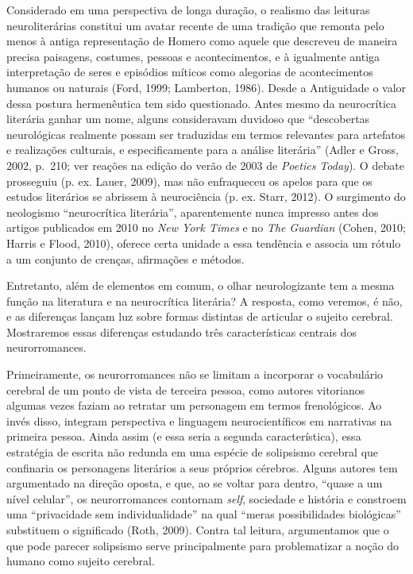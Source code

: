 Considerado em uma perspectiva de longa duração, o realismo das leituras neuroliterárias
constitui um avatar recente de uma tradição que remonta pelo menos à
antiga representação de Homero como aquele que descreveu de maneira
precisa paisagens, costumes, pessoas e acontecimentos, e à igualmente
antiga interpretação de seres e episódios míticos como alegorias de
acontecimentos humanos ou naturais (Ford, 1999; Lamberton, 1986).
Desde a Antiguidade o valor dessa postura hermenêutica tem sido
questionado. Antes mesmo da neurocrítica literária ganhar um nome,
alguns consideravam duvidoso que ``descobertas neurológicas realmente
possam ser traduzidas em termos relevantes para artefatos e realizações
culturais, e especificamente para a análise literária'' (Adler e Gross,
2002, p.~210; ver reações na edição do verão de 2003 de \emph{Poetics
Today}). O debate prosseguiu (p. ex. Lauer, 2009), mas não enfraqueceu os
apelos para que os estudos literários se abrissem à neurociência (p. ex.
Starr, 2012). O surgimento do neologismo ``neurocrítica literária'',
aparentemente nunca impresso antes dos artigos publicados em 2010 no
\emph{New York Times} e no \emph{The} \emph{Guardian} (Cohen, 2010;
Harris e Flood, 2010), oferece certa unidade a essa tendência e associa
um rótulo a um conjunto de crenças, afirmações e métodos.

Entretanto, além de elementos em comum, o olhar neurologizante tem a
mesma função na literatura e na neurocrítica literária? A resposta, como
veremos, é não, e as diferenças lançam luz sobre formas distintas de
articular o sujeito cerebral. Mostraremos essas diferenças estudando
três características centrais dos neurorromances.

Primeiramente, os neurorromances não se limitam a incorporar o
vocabulário cerebral de um ponto de vista de terceira pessoa, como
autores vitorianos algumas vezes faziam ao retratar um personagem em
termos frenológicos. Ao invés disso, integram perspectiva e linguagem
neurocientíficos em narrativas na primeira pessoa. Ainda assim (e essa
seria a segunda característica), essa estratégia de escrita não redunda
em uma espécie de solipsismo cerebral que confinaria os personagens
literários a seus próprios cérebros. Alguns autores tem argumentado na
direção oposta, e que, ao
se voltar para dentro, ``quase a um nível celular'', os neurorromances
contornam \emph{self}, sociedade e história e constroem uma ``privacidade sem
individualidade'' na qual ``meras possibilidades
biológicas'' substituem o significado (Roth, 2009). Contra tal leitura,
argumentamos que o que pode parecer solipsismo serve principalmente para
problematizar a noção do humano como sujeito cerebral.

